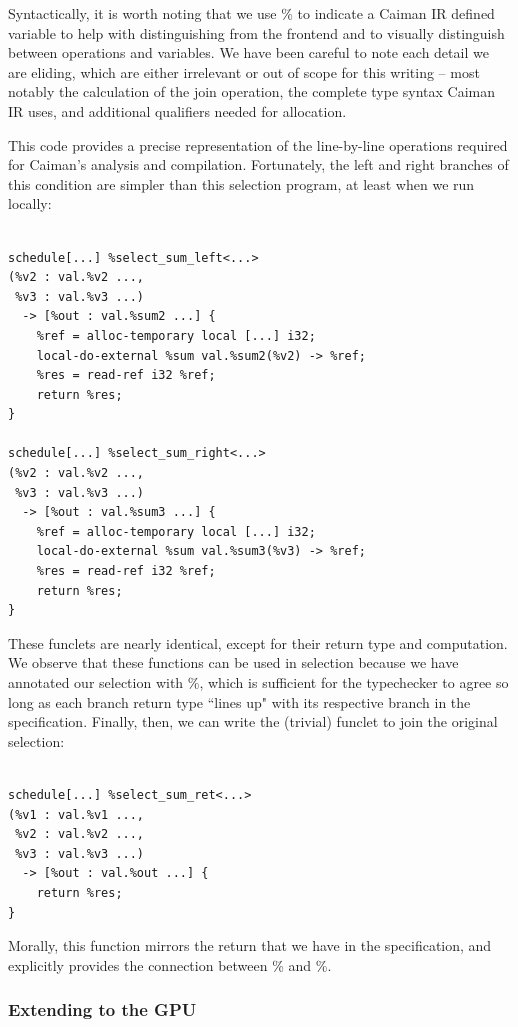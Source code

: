 Syntactically, it is worth noting that we use \% to indicate a Caiman IR defined variable to help with distinguishing from the frontend and to visually distinguish between operations and variables.  We have been careful to note each detail we are eliding, which are either irrelevant or out of scope for this writing -- most notably the calculation of the join operation, the complete type syntax Caiman IR uses, and additional qualifiers needed for allocation.

This code provides a precise representation of the line-by-line operations required for Caiman's analysis and compilation.  Fortunately, the left and right branches of this condition are simpler than this selection program, at least when we run locally:
%
\begin{lstlisting}

schedule[...] %select_sum_left<...>
(%v2 : val.%v2 ..., 
 %v3 : val.%v3 ...) 
  -> [%out : val.%sum2 ...] {
    %ref = alloc-temporary local [...] i32;
    local-do-external %sum val.%sum2(%v2) -> %ref;
    %res = read-ref i32 %ref;
    return %res;
}

schedule[...] %select_sum_right<...>
(%v2 : val.%v2 ..., 
 %v3 : val.%v3 ...) 
  -> [%out : val.%sum3 ...] {
    %ref = alloc-temporary local [...] i32;
    local-do-external %sum val.%sum3(%v3) -> %ref;
    %res = read-ref i32 %ref;
    return %res;
}
\end{lstlisting}
%
These funclets are nearly identical, except for their return type and computation.  We observe that these functions can be used in selection because we have annotated our selection with \%, which is sufficient for the typechecker to agree so long as each branch return type ``lines up" with its respective branch in the specification.  Finally, then, we can write the (trivial) funclet to join the original selection:
%
\begin{lstlisting}

schedule[...] %select_sum_ret<...>
(%v1 : val.%v1 ..., 
 %v2 : val.%v2 ..., 
 %v3 : val.%v3 ...) 
  -> [%out : val.%out ...] {
    return %res;
}
\end{lstlisting}
%
Morally, this function mirrors the return that we have in the specification, and explicitly provides the connection between \% and \%.

\subsubsection{Extending to the GPU}
\label{subsec:gpuir}

